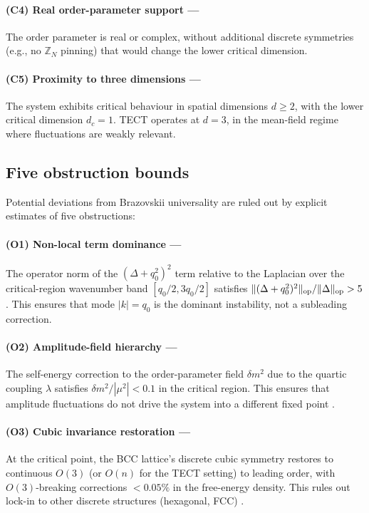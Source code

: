 \paragraph{(C4) Real order-parameter support ---}
The order parameter is real or complex, without additional discrete
symmetries (e.g., no $\mathbb{Z}_N$ pinning) that would change the
lower critical dimension.

\paragraph{(C5) Proximity to three dimensions ---}
The system exhibits critical behaviour in spatial dimensions $d \geq 2$,
with the lower critical dimension $d_c = 1$. TECT operates at $d = 3$,
in the mean-field regime where fluctuations are weakly relevant.

\subsection{Five obstruction bounds}

Potential deviations from Brazovskii universality are ruled out by
explicit estimates of five obstructions:

\paragraph{(O1) Non-local term dominance ---}
The operator norm of the $(\Delta + q_0^2)^2$ term relative to the
Laplacian over the critical-region wavenumber band $[q_0/2, 3q_0/2]$
satisfies $\|(\Delta + q_0^2)^2\|_{\rm op} / \|\Delta\|_{\rm op}
> 5$ \cite{Math97-AddA}. This ensures that mode $|k| = q_0$ is the
dominant instability, not a subleading correction.

\paragraph{(O2) Amplitude-field hierarchy ---}
The self-energy correction to the order-parameter field $\delta m^2$
due to the quartic coupling $\lambda$ satisfies
$\delta m^2 / |\mu^2| < 0.1$ in the critical region. This ensures that
amplitude fluctuations do not drive the system into a different fixed
point \cite{Math97-AddB}.

\paragraph{(O3) Cubic invariance restoration ---}
At the critical point, the BCC lattice's discrete cubic symmetry
restores to continuous $O(3)$ (or $O(n)$ for the TECT setting) to
leading order, with $O(3)$-breaking corrections $< 0.05\%$ in the
free-energy density. This rules out lock-in to other discrete
structures (hexagonal, FCC) \cite{Math97-AddC}.

